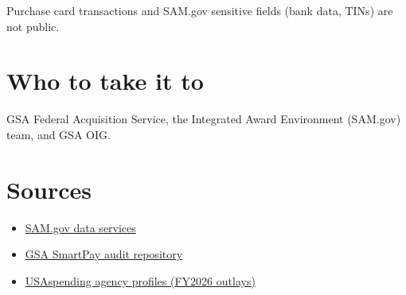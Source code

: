 \documentclass[letterpaper,11pt]{article}
\providecommand{\tightlist}{\setlength{\itemsep}{0pt}\setlength{\parskip}{0pt}}
\begin{document}
Purchase card transactions and SAM.gov sensitive fields (bank data,
TINs) are not public.

\hypertarget{who-to-take-it-to}{%
\section{Who to take it to}\label{who-to-take-it-to}}

GSA Federal Acquisition Service, the Integrated Award Environment
(SAM.gov) team, and GSA OIG.

\hypertarget{sources}{%
\section{Sources}\label{sources}}

\begin{itemize}
\tightlist
\item
  \href{https://sam.gov/data-services}{SAM.gov data services}
\item
  \href{https://smartpay.gsa.gov/guidance-and-audits/audits/}{GSA
  SmartPay audit repository}
\item
  \href{https://www.usaspending.gov/agency}{USAspending agency profiles
  (FY2026 outlays)}
\end{itemize}
\end{document}
